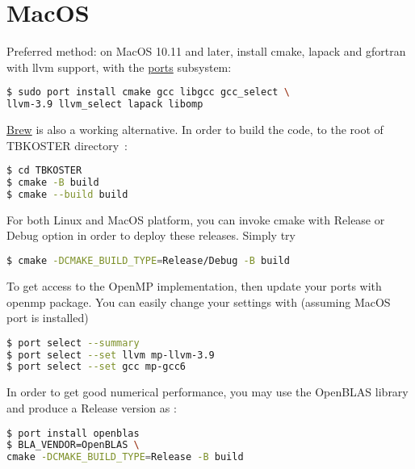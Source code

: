 \documentclass[12pt, onecolumn]{memoir}
\begin{document}
\section{MacOS}
Preferred method: on MacOS 10.11 and later, install cmake, lapack and gfortran with llvm support, with the \href{https://www.macports.org}{ports} subsystem:
\begin{lstlisting}[language=sh,basicstyle=\small\ttfamily,frame=single]
$ sudo port install cmake gcc libgcc gcc_select \
llvm-3.9 llvm_select lapack libomp
\end{lstlisting}
\href{https://brew.sh}{Brew} is also a working alternative.
In order to build the code, to the root of TBKOSTER directory~:
\begin{lstlisting}[language=sh,basicstyle=\small\ttfamily,frame=single]
$ cd TBKOSTER
$ cmake -B build
$ cmake --build build
\end{lstlisting}
For both Linux and MacOS platform, you can invoke cmake with Release or Debug option in order to deploy these releases. Simply try
\begin{lstlisting}[language=sh,basicstyle=\small\ttfamily]
$ cmake -DCMAKE_BUILD_TYPE=Release/Debug -B build
\end{lstlisting}
To get access to the OpenMP implementation, then update your ports with openmp package. You can easily change your settings with (assuming MacOS port is installed)
\begin{lstlisting}[language=sh,basicstyle=\small\ttfamily,frame=single]
$ port select --summary
$ port select --set llvm mp-llvm-3.9
$ port select --set gcc mp-gcc6
\end{lstlisting}
In order to get good numerical performance, you may use the OpenBLAS library and produce a Release version as :
\begin{lstlisting}[language=sh,basicstyle=\small\ttfamily,frame=single]
$ port install openblas
$ BLA_VENDOR=OpenBLAS \
cmake -DCMAKE_BUILD_TYPE=Release -B build
\end{lstlisting}
\end{document}
